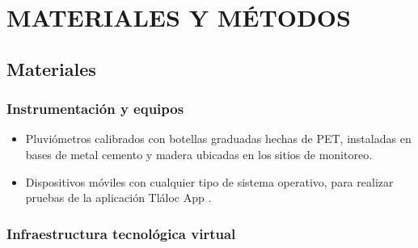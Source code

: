 \chapter{MATERIALES Y MÉTODOS}





\section{Materiales}
\subsection{Instrumentación y equipos}
\begin{itemize}
    \item Pluviómetros calibrados con botellas graduadas hechas de PET, instaladas en bases de metal cemento y madera ubicadas en los sitios de monitoreo.
    \item Dispositivos móviles con cualquier tipo de sistema operativo, para realizar pruebas de la aplicación Tláloc App .
\end{itemize}

\subsection{Infraestructura tecnológica virtual}

